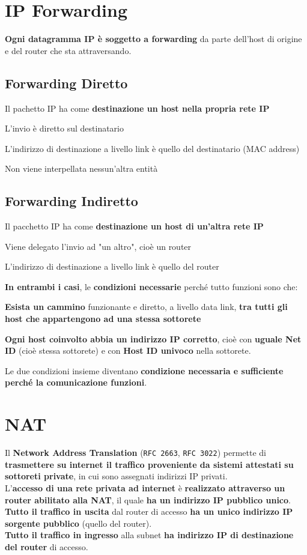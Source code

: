 \documentclass[10pt]{article}
\begin{document}
\section{IP Forwarding}
\textbf{Ogni datagramma IP è soggetto a forwarding} da parte dell'host di origine e del router che sta attraversando.
\subsection{Forwarding Diretto} Il pachetto IP ha come \textbf{destinazione un host nella propria rete IP}
\begin{list}{}{}
\item L'invio è diretto sul destinatario
\item L'indirizzo di destinazione a livello link è quello del destinatario (MAC address)
\item Non viene interpellata nessun'altra entità
\end{list}
\subsection{Forwarding Indiretto} Il pacchetto IP ha come \textbf{destinazione un host di un'altra rete IP}
\begin{list}{}{}
\item Viene delegato l'invio ad "un altro", cioè un router
\item L'indirizzo di destinazione a livello link è quello del router
\end{list}
\textbf{In entrambi i casi}, le \textbf{condizioni necessarie} perché tutto funzioni sono che:
\begin{list}{}{}
\item \textbf{Esista un cammino} funzionante e diretto, a livello data link, \textbf{tra tutti gli host che appartengono ad una stessa sottorete}
\item \textbf{Ogni host coinvolto abbia un indirizzo IP corretto}, cioè con \textbf{uguale Net ID} (cioè stessa sottorete) e con \textbf{Host ID univoco} nella sottorete.
\end{list}
Le due condizioni insieme diventano \textbf{condizione necessaria e sufficiente perché la comunicazione funzioni}.
\pagebreak
\section{NAT}
Il \textbf{Network Address Translation} (\texttt{RFC 2663}, \texttt{RFC 3022}) permette di \textbf{trasmettere su internet il traffico proveniente da sistemi attestati su sottoreti private}, in cui sono assegnati indirizzi IP privati.\\
L'\textbf{accesso di una rete privata ad internet} è \textbf{realizzato attraverso un router abilitato alla NAT}, il quale \textbf{ha un indirizzo IP pubblico unico}.\\
\textbf{Tutto il traffico in uscita} dal router di accesso \textbf{ha un unico indirizzo IP sorgente pubblico} (quello del router).\\
\textbf{Tutto il traffico in ingresso} alla subnet \textbf{ha indirizzo IP di destinazione del router} di accesso.
\end{document}
